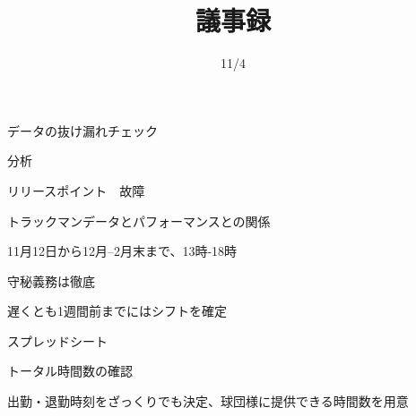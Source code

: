 \documentclass{jsarticle}
\begin{document}
\title{議事録}
\date{11/4}
\maketitle

データの抜け漏れチェック

分析

リリースポイント　故障

トラックマンデータとパフォーマンスとの関係

11月12日から12月--2月末まで、13時-18時

守秘義務は徹底

遅くとも1週間前までにはシフトを確定

スプレッドシート

トータル時間数の確認

出勤・退勤時刻をざっくりでも決定、球団様に提供できる時間数を用意
\end{document}
